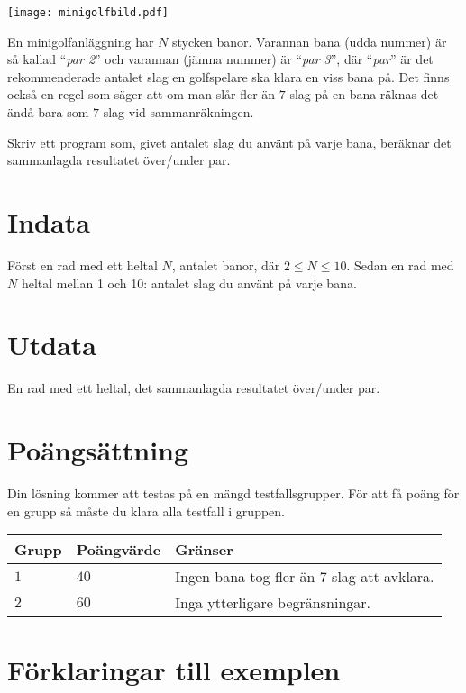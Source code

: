 
\begin{center}
\texttt{[image: minigolfbild.pdf]}
\end{center}

En minigolfanläggning har $N$ stycken banor. Varannan bana (udda nummer) är så kallad ``{\em par 2}'' och
varannan (jämna nummer) är ``{\em par 3}'', där ``{\em par}'' är det rekommenderade antalet slag en golfspelare ska klara
en viss bana på. Det finns också en regel som säger att om man slår fler än $7$ slag på en bana räknas det ändå
bara som $7$ slag vid sammanräkningen.

Skriv ett program som, givet antalet slag du använt på varje bana, beräknar det sammanlagda resultatet över/under par. 

\section*{Indata}
Först en rad med ett heltal $N$, antalet banor, där $2\le N\le 10$. Sedan en rad med $N$ heltal mellan 1 och 10: antalet slag du använt på varje bana.

\section*{Utdata}
En rad med ett heltal, det sammanlagda resultatet över/under par.

\section*{Poängsättning}
\noindent
Din lösning kommer att testas på en mängd testfallsgrupper.
\noindent
För att få poäng för en grupp så måste du klara alla testfall i gruppen.

\noindent
\begin{tabular}{| l | l | l |}
\hline
  Grupp & Poängvärde & Gränser \\ \hline
  $1$    & $40$       &  Ingen bana tog fler än 7 slag att avklara.  \\ \hline 
  $2$    & $60$       &  Inga ytterligare begränsningar. \\ \hline
\end{tabular}

\section*{Förklaringar till exemplen}

